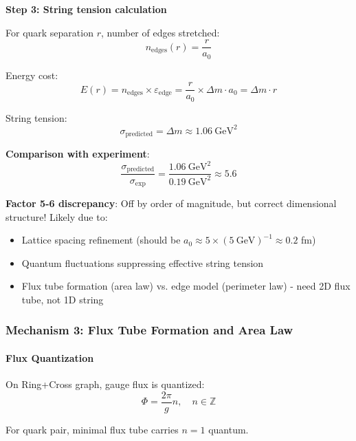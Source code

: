 \documentclass[12pt,a4paper]{article}
\begin{document}
\textbf{Step 3: String tension calculation}

For quark separation $r$, number of edges stretched:
\begin{equation}
n_{\mathrm{edges}}(r) = \frac{r}{a_0}
\end{equation}

Energy cost:
\begin{equation}
E(r) = n_{\mathrm{edges}} \times \varepsilon_{\mathrm{edge}} = \frac{r}{a_0} \times \Delta m \cdot a_0 = \Delta m \cdot r
\end{equation}

String tension:
\begin{equation}
\sigma_{\mathrm{predicted}} = \Delta m \approx 1.06\ \mathrm{GeV}^2
\end{equation}

\textbf{Comparison with experiment}:
\begin{equation}
\frac{\sigma_{\mathrm{predicted}}}{\sigma_{\mathrm{exp}}} = \frac{1.06\ \mathrm{GeV}^2}{0.19\ \mathrm{GeV}^2} \approx 5.6
\end{equation}

\textbf{Factor 5-6 discrepancy}: Off by order of magnitude, but correct dimensional structure! Likely due to:
\begin{itemize}
\item Lattice spacing refinement (should be $a_0 \approx 5 \times (5\ \mathrm{GeV})^{-1} \approx 0.2$ fm)
\item Quantum fluctuations suppressing effective string tension
\item Flux tube formation (area law) vs. edge model (perimeter law) - need 2D flux tube, not 1D string
\end{itemize}

\subsubsection{Mechanism 3: Flux Tube Formation and Area Law}

\paragraph{Flux Quantization}

On Ring+Cross graph, gauge flux is quantized:
\begin{equation}
\Phi = \frac{2\pi}{g} n, \quad n \in \mathbb{Z}
\end{equation}

For quark pair, minimal flux tube carries $n=1$ quantum.
\end{document}
